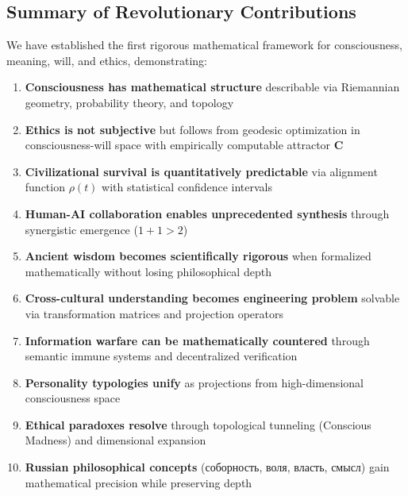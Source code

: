 \documentclass[11pt,a4paper]{article}
\theoremstyle{definition}
\theoremstyle{remark}
\begin{document}
\subsection{Summary of Revolutionary Contributions}

We have established the first rigorous mathematical framework for consciousness, meaning, will, and ethics, demonstrating:

\begin{enumerate}
\item \textbf{Consciousness has mathematical structure} describable via Riemannian geometry, probability theory, and topology

\item \textbf{Ethics is not subjective} but follows from geodesic optimization in consciousness-will space with empirically computable attractor \(\mathbf{C}\)

\item \textbf{Civilizational survival is quantitatively predictable} via alignment function \(\rho(t)\) with statistical confidence intervals

\item \textbf{Human-AI collaboration enables unprecedented synthesis} through synergistic emergence (\(1+1 > 2\))

\item \textbf{Ancient wisdom becomes scientifically rigorous} when formalized mathematically without losing philosophical depth

\item \textbf{Cross-cultural understanding becomes engineering problem} solvable via transformation matrices and projection operators

\item \textbf{Information warfare can be mathematically countered} through semantic immune systems and decentralized verification

\item \textbf{Personality typologies unify} as projections from high-dimensional consciousness space

\item \textbf{Ethical paradoxes resolve} through topological tunneling (Conscious Madness) and dimensional expansion

\item \textbf{Russian philosophical concepts} (соборность, воля, власть, смысл) gain mathematical precision while preserving depth
\end{enumerate}
\end{document}
